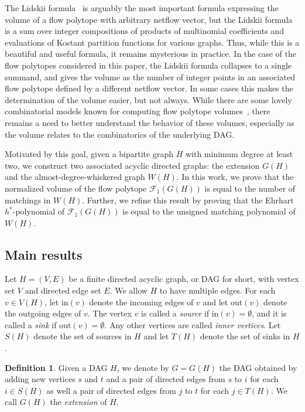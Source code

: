 \documentclass[12pt]{amsart}
\theoremstyle{definition}
\newtheorem{definition}[theorem]{Definition}
\newcommand\calF{\mathcal{F}}
\begin{document}
The Lidskii formula~\cite{baldoni-vergne,lidskii,meszaros-morales} is arguably the most important formula expressing the volume of a flow polytope with arbitrary netflow vector, but the Lidskii formula is a sum over integer compositions of products of multinomial coefficients and evaluations of Kostant partition functions for various graphs.
Thus, while this is a beautiful and useful formula, it remains mysterious in practice.
In the case of the flow polytopes considered in this paper, the Lidskii formula collapses to a single summand, and gives the volume as the number of integer points in an associated flow polytope defined by a different netflow vector.
In some cases this makes the determination of the volume easier, but not always.
While there are some lovely combinatorial models known for computing flow polytope volumes~\cite{combflowmodel}, there remains a need to better understand the behavior of these volumes, especially as the volume relates to the combinatorics of the underlying DAG.

Motivated by this goal, given a bipartite graph $H$ with minimum degree at least two, we construct two associated acyclic directed graphs: the extension $G(H)$ and the almost-degree-whiskered graph $W(H)$.
In this work, we prove that the normalized volume of the flow polytope $\calF_1(G(H))$ is equal to the number of matchings in $W(H)$.
Further, we refine this result by proving that the Ehrhart $h^*$-polynomial of $\calF_1(G(H))$ is equal to the unsigned matching polynomial of $W(H)$.

\subsection{Main results}

Let \(H=(V,E)\) be a finite directed acyclic graph, or DAG for short, with vertex set $V$ and directed edge set $E$.
We allow \(H\) to have multiple edges.
For each $v\in V(H)$, let $\mathrm{in}(v)$ denote the incoming edges of $v$ and let $\mathrm{out}(v)$ denote the outgoing edges of $v$. 
The vertex $v$ is called a \emph{source} if $\mathrm{in}(v) =\emptyset$, and it is called a \emph{sink} if $\mathrm{out}(v) = \emptyset$. 
Any other vertices are called \emph{inner vertices}. 
Let \(S(H)\) denote the set of sources in \(H\) and let \(T(H)\) denote the set of sinks in \(H\).

\begin{definition}\label{def:extension}
Given a DAG \(H\), we denote by \(G=G(H)\) the DAG obtained by adding new vertices \(s\) and \(t\) and a pair of directed edges from \(s\) to \(i\) for each \(i \in S(H)\) as well a pair of directed edges from \(j\) to \(t\) for each \(j \in T(H)\).
We call \(G(H)\) the \emph{extension} of \(H\).
\end{definition}
\end{document}
